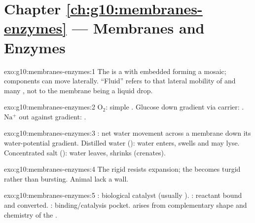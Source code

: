 \section*{Chapter \ref{ch:g10:membranes-enzymes} --- Membranes and Enzymes}

\begin{solution}{exo:g10:membranes-enzymes:1}
The  is a  with embedded 
forming a mosaic; components can move laterally. ``Fluid'' refers to that
lateral mobility of  and many , not to the membrane being
a liquid drop.
\end{solution}

\begin{solution}{exo:g10:membranes-enzymes:2}
$\mathrm{O_2}$: simple . Glucose down gradient via carrier:
. $\mathrm{Na^+}$ out against gradient: .
\end{solution}

\begin{solution}{exo:g10:membranes-enzymes:3}
: net water movement across a  membrane down
its water-potential gradient. Distilled water (): water enters,
 swells and may lyse. Concentrated salt (): water leaves,
 shrinks (crenates).
\end{solution}

\begin{solution}{exo:g10:membranes-enzymes:4}
The rigid  resists expansion; the  becomes turgid rather
than bursting. Animal  lack a wall.
\end{solution}

\begin{solution}{exo:g10:membranes-enzymes:5}
: biological catalyst (usually ). : reactant bound
and converted. : binding/catalysis pocket.  arises
from complementary shape and chemistry of the .
\end{solution}

